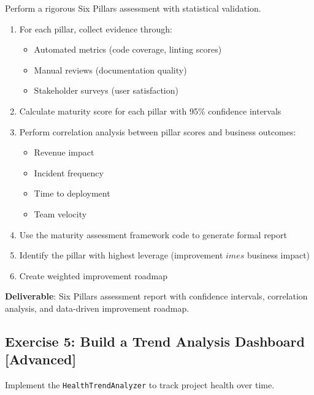 Perform a rigorous Six Pillars assessment with statistical validation.

\begin{enumerate}
    \item For each pillar, collect evidence through:
        \begin{itemize}
            \item Automated metrics (code coverage, linting scores)
            \item Manual reviews (documentation quality)
            \item Stakeholder surveys (user satisfaction)
        \end{itemize}
    \item Calculate maturity score for each pillar with 95\% confidence intervals
    \item Perform correlation analysis between pillar scores and business outcomes:
        \begin{itemize}
            \item Revenue impact
            \item Incident frequency
            \item Time to deployment
            \item Team velocity
        \end{itemize}
    \item Use the maturity assessment framework code to generate formal report
    \item Identify the pillar with highest leverage (improvement $	imes$ business impact)
    \item Create weighted improvement roadmap
\end{enumerate}

\textbf{Deliverable}: Six Pillars assessment report with confidence intervals, correlation analysis, and data-driven improvement roadmap.

\subsection{Exercise 5: Build a Trend Analysis Dashboard [Advanced]}

Implement the \texttt{HealthTrendAnalyzer} to track project health over time.

